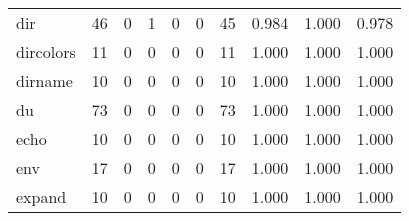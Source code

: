 \begin{longtable}{lp{2.0cm}p{2.0cm}p{2.0cm}p{2.0cm}p{2.0cm}p{2.0cm}p{2.0cm}p{2.0cm}p{2.0cm}}
dir       &                     46 &                                             0 &                                            1 &                                           0 &                                            0 &                                         45 &                                0.984 &                                  1.000 &                                0.978 \\
dircolors &                     11 &                                             0 &                                            0 &                                           0 &                                            0 &                                         11 &                                1.000 &                                  1.000 &                                1.000 \\
dirname   &                     10 &                                             0 &                                            0 &                                           0 &                                            0 &                                         10 &                                1.000 &                                  1.000 &                                1.000 \\
du        &                     73 &                                             0 &                                            0 &                                           0 &                                            0 &                                         73 &                                1.000 &                                  1.000 &                                1.000 \\
echo      &                     10 &                                             0 &                                            0 &                                           0 &                                            0 &                                         10 &                                1.000 &                                  1.000 &                                1.000 \\
env       &                     17 &                                             0 &                                            0 &                                           0 &                                            0 &                                         17 &                                1.000 &                                  1.000 &                                1.000 \\
expand    &                     10 &                                             0 &                                            0 &                                           0 &                                            0 &                                         10 &                                1.000 &                                  1.000 &                                1.000 \\

\end{longtable}
